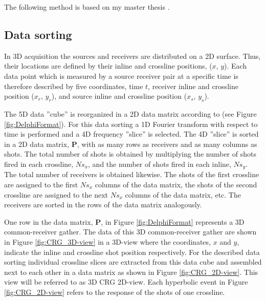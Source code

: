 \documentclass{madrid15WS}
\begin{document}
The following method is based on my master thesis \citep{myself}.

\subsection{Data sorting}

In 3D acquisition the sources and receivers are distributed on a 2D surface. Thus, their locations are defined by their inline and crossline positions, ($x$, $y$). Each data point which is measured by a source receiver pair at a specific time is therefore described by five coordinates, time $t$, receiver inline and crossline position ($x_r$, $y_r$), and source inline and crossline position ($x_s$, $y_s$).

The 5D data ”cube” is reorganized in a 2D data matrix according to \citet{Delphi-Format} (see Figure \ref{fig:DelphiFormat}). For this data sorting a 1D Fourier transform with respect to time is performed and a 4D frequency ”slice” is selected. The 4D ”slice” is sorted in a 2D data matrix, $\mathbf{P}$, with as many rows as receivers and as many columns as shots. The total number of shots is obtained by multiplying the number of shots fired in each crossline, $Ns_x$, and the number of shots fired in each inline, $Ns_y$. The total number of receivers is obtained likewise. The shots of the first crossline are assigned to the first $Ns_x$ columns of the data matrix, the shots of the second crossline are assigned to the next $Ns_x$ columns of the data matrix, etc. The receivers are sorted in the rows of the data matrix analogously.

One row in the data matrix, $\mathbf{P}$, in Figure \ref{fig:DelphiFormat} represents a 3D common-receiver gather. The data of this 3D common-receiver gather are shown in Figure \ref{fig:CRG_3D-view} in a 3D-view where the coordinates, $x$ and $y$, indicate the inline and crossline shot position respectively. For the described data sorting individual crossline slices are extracted from this data cube and assembled next to each other in a data matrix as shown in Figure \ref{fig:CRG_2D-view}. This view will be referred to as 3D CRG 2D-view. Each hyperbolic event in Figure \ref{fig:CRG_2D-view} refers to the response of the shots of one crossline.
\end{document}
